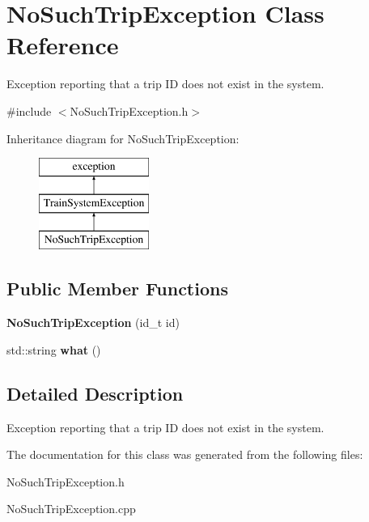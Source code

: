 \hypertarget{classNoSuchTripException}{}\section{No\+Such\+Trip\+Exception Class Reference}
\label{classNoSuchTripException}


Exception reporting that a trip ID does not exist in the system.  




{\ttfamily \#include $<$No\+Such\+Trip\+Exception.\+h$>$}

Inheritance diagram for No\+Such\+Trip\+Exception\+:\begin{figure}[H]
\begin{center}
\leavevmode
\includegraphics[height=3.000000cm]{classNoSuchTripException}
\end{center}
\end{figure}
\subsection*{Public Member Functions}
\begin{DoxyCompactItemize}
\item 
\mbox{\label{classNoSuchTripException_ad4e2e75706508833ccbb7a793092734c}} 
{\bfseries No\+Such\+Trip\+Exception} (id\+\_\+t id)
\item 
\mbox{\label{classNoSuchTripException_aa3688b73cc264a2b19f430501f3131bd}} 
std\+::string {\bfseries what} ()
\end{DoxyCompactItemize}


\subsection{Detailed Description}
Exception reporting that a trip ID does not exist in the system. 

The documentation for this class was generated from the following files\+:\begin{DoxyCompactItemize}
\item 
No\+Such\+Trip\+Exception.\+h\item 
No\+Such\+Trip\+Exception.\+cpp\end{DoxyCompactItemize}
